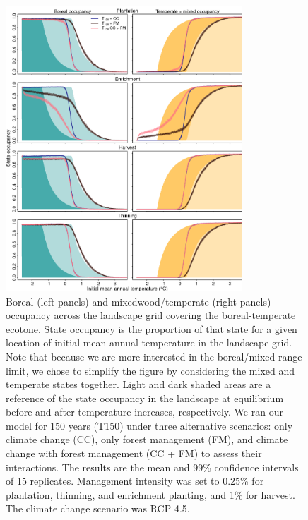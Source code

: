 \documentclass[12pt]{article}
\begin{document}
\begin{figure}
\hypertarget{fig:sim-result}{%
\centering
\includegraphics[width=0.79\textwidth,height=\textheight]{manuscript/img/sim-result_RCP4.5.png}
\caption{Boreal (left panels) and mixedwood/temperate (right panels)
occupancy across the landscape grid covering the boreal-temperate
ecotone. State occupancy is the proportion of that state for a given
location of initial mean annual temperature in the landscape grid. Note
that because we are more interested in the boreal/mixed range limit, we
chose to simplify the figure by considering the mixed and temperate
states together. Light and dark shaded areas are a reference of the
state occupancy in the landscape at equilibrium before and after
temperature increases, respectively. We ran our model for 150 years
(T150) under three alternative scenarios: only climate change (CC), only
forest management (FM), and climate change with forest management (CC +
FM) to assess their interactions. The results are the mean and 99\%
confidence intervals of 15 replicates. Management intensity was set to
0.25\% for plantation, thinning, and enrichment planting, and 1\% for
harvest. The climate change scenario was RCP 4.5.}\label{fig:sim-result}
}
\end{figure}
\end{document}
